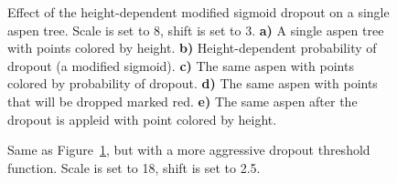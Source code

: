 \begin{figure}
\caption[Effect of the height-dependent modified sigmoid dropout on a single aspen tree.]{\label{fig-height-dropout}Effect of the height-dependent
modified sigmoid dropout on a single aspen tree. Scale is set to 8,
shift is set to 3. \textbf{a)} A single aspen tree with points colored
by height. \textbf{b)} Height-dependent probability of dropout (a
modified sigmoid). \textbf{c)} The same aspen with points colored by
probability of dropout. \textbf{d)} The same aspen with points that will
be dropped marked red. \textbf{e)} The same aspen after the dropout is
appleid with point colored by height.}
\end{figure}

\begin{figure}
\caption[Effect of a stronger height-dependent modified sigmoid dropout on a single aspen tree.]{\label{fig-height-dropout-aggressive}Same as
Figure~\ref{fig-height-dropout}, but with a more aggressive dropout
threshold function. Scale is set to 18, shift is set to 2.5.}
\end{figure}

